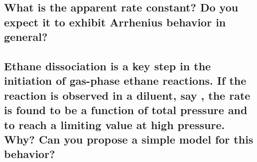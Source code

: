 \documentclass[11pt]{article}
\begin{document}
\subsection{What is the apparent rate constant?  Do you expect it to exhibit Arrhenius behavior in general?}
\label{sec:org170d657}

\subsection{Ethane dissociation  is a key step in the initiation of gas-phase ethane reactions. If the reaction is observed in a diluent, say , the rate is found to be a function of total pressure and to reach a limiting value at high pressure. Why? Can you propose a simple model for this behavior?}
\label{sec:orgd0366a0}
\end{document}
